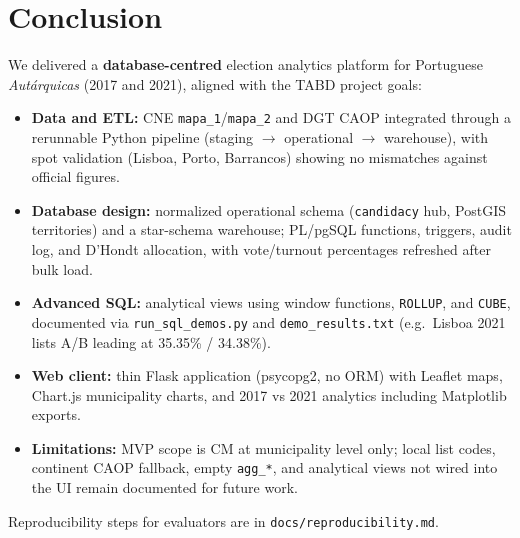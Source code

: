 \section{Conclusion}
We delivered a \textbf{database-centred} election analytics platform for Portuguese \textit{Autárquicas} (2017 and 2021), aligned with the TABD project goals:
\begin{itemize}
    \item \textbf{Data and ETL:} CNE \texttt{mapa\_1}/\texttt{mapa\_2} and DGT CAOP integrated through a rerunnable Python pipeline (staging $\rightarrow$ operational $\rightarrow$ warehouse), with spot validation (Lisboa, Porto, Barrancos) showing no mismatches against official figures.
    \item \textbf{Database design:} normalized operational schema (\texttt{candidacy} hub, PostGIS territories) and a star-schema warehouse; PL/pgSQL functions, triggers, audit log, and D'Hondt allocation, with vote/turnout percentages refreshed after bulk load.
    \item \textbf{Advanced SQL:} analytical views using window functions, \texttt{ROLLUP}, and \texttt{CUBE}, documented via \texttt{run\_sql\_demos.py} and \texttt{demo\_results.txt} (e.g.\ Lisboa 2021 lists A/B leading at 35.35\% / 34.38\%).
    \item \textbf{Web client:} thin Flask application (psycopg2, no ORM) with Leaflet maps, Chart.js municipality charts, and 2017 vs 2021 analytics including Matplotlib exports.
    \item \textbf{Limitations:} MVP scope is CM at municipality level only; local list codes, continent CAOP fallback, empty \texttt{agg\_*}, and analytical views not wired into the UI remain documented for future work.
\end{itemize}
Reproducibility steps for evaluators are in \texttt{docs/reproducibility.md}.
